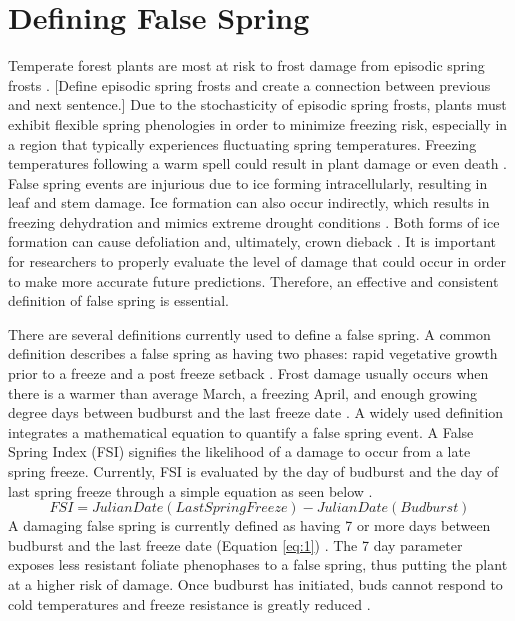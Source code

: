 \documentclass{article}\usepackage[]{graphicx}\usepackage[]{color}
\begin{document}
\section{Defining False Spring}
Temperate forest plants are most at risk to frost damage from episodic spring frosts \citep{Sakai1987}. [Define episodic spring frosts and create a connection between previous and next sentence.] Due to the stochasticity of episodic spring frosts, plants must exhibit flexible spring phenologies in order to minimize freezing risk, especially in a region that typically experiences fluctuating spring temperatures. Freezing temperatures following a warm spell could result in plant damage or even death \citep{Ludlum1968, Mock2007}. False spring events are injurious due to ice forming intracellularly, resulting in leaf and stem damage. Ice formation can also occur indirectly, which results in freezing dehydration and mimics extreme drought conditions \citep{Pearce2001, Beck2004, Hofmann2015}. Both forms of ice formation can cause defoliation and, ultimately, crown dieback \citep{Gu2008}. It is important for researchers to properly evaluate the level of damage that could occur in order to make more accurate future predictions. Therefore, an effective and consistent definition of false spring is essential.

There are several definitions currently used to define a false spring. A common definition describes a false spring as having two phases: rapid vegetative growth prior to a freeze and a post freeze setback \citep{Gu2008}. Frost damage usually occurs when there is a warmer than average March, a freezing April, and enough growing degree days between budburst and the last freeze date \citep{Augspurger2013}. A widely used definition integrates a mathematical equation to quantify a false spring event. A False Spring Index (FSI) signifies the likelihood of a damage to occur from a late spring freeze. Currently, FSI is evaluated by the day of budburst and the day of last spring freeze through a simple equation as seen below \citep{Marino2011}. 
\begin{equation} \label{eq:1}
FSI = Julian Date (Last Spring Freeze) - Julian Date (Budburst)
\end{equation}
A damaging false spring is currently defined as having 7 or more days between budburst and the last freeze date (Equation \ref{eq:1}) \citep{Peterson2014}. The 7 day parameter exposes less resistant foliate phenophases to a false spring, thus putting the plant at a higher risk of damage. Once budburst has initiated, buds cannot respond to cold temperatures and freeze resistance is greatly reduced \citep{Taschler2004, Lenz2013, Vitasse2014}.
\end{document}

